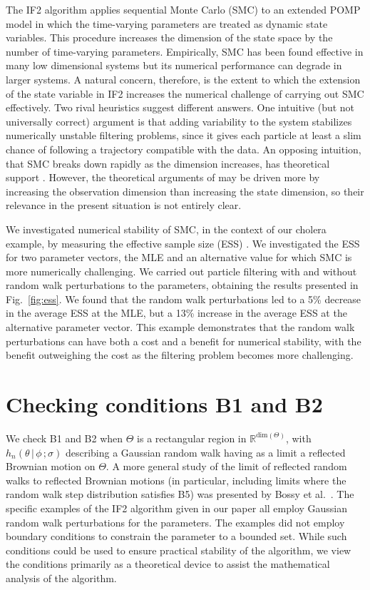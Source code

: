 \documentclass[11pt]{article}
\newcommand{\bbTheta}{\Theta}
\def\R{\mathbb{R}}
\newcommand\Thetaspace{{\bbTheta}}
\newcommand\Thetadim{{\mathrm{dim}}(\Thetaspace)}
\newcommand\given{{\, | \,}}
\newcommand\giventh{\,;}
\begin{document}
The IF2 algorithm applies sequential Monte Carlo (SMC) to an extended POMP model in which the time-varying parameters are treated as dynamic state variables.
This procedure increases the dimension of the state space by the number of time-varying parameters.
Empirically, SMC has been found effective in many low dimensional systems but its numerical performance can degrade in larger systems.
A natural concern, therefore, is the extent to which the extension of the state variable in IF2 increases the numerical challenge of carrying out SMC effectively. 
Two rival heuristics suggest different answers. 
One intuitive (but not universally correct) argument is that adding variability to the system stabilizes numerically unstable filtering problems, since it gives each particle at least a slim chance of following a trajectory compatible with the data.
An opposing intuition, that SMC breaks down rapidly as the dimension increases, has theoretical support \cite{bengtsson08}.
However, the theoretical arguments of \cite{bengtsson08} may be driven more by increasing the observation dimension than increasing the state dimension, so their relevance in the present situation is not entirely clear.

We investigated numerical stability of SMC, in the context of our cholera example, by measuring the effective sample size (ESS) \cite{liu01a}.
We investigated the ESS for two parameter vectors, the MLE and an alternative value for which SMC is more numerically challenging.
We carried out particle filtering with and without random walk perturbations to the parameters, obtaining the results presented in Fig.~\ref{fig:ess}.
We found that the random walk perturbations led to a 5\% decrease in the average ESS at the MLE, but a 13\% increase in the average ESS at the alternative parameter vector.
This example demonstrates that the random walk perturbations can have both a cost and a benefit for numerical stability, with the benefit outweighing the cost as the filtering problem becomes more challenging.



\section{Checking conditions B1 and B2}\label{sec:b1b2}

We check B1 and B2 when $\Theta$ is a rectangular region in $\R^{\Thetadim}$, with $h_n(\theta\given \phi\giventh\sigma)$ describing a Gaussian random walk having as a limit a reflected Brownian motion on $\Theta$. 
A more general study of the limit of reflected random walks to reflected Brownian motions (in particular, including limits where the random walk step distribution satisfies B5) was presented by Bossy et al.~\cite{bossy04}.
The specific examples of the IF2 algorithm given in our paper all employ Gaussian random walk perturbations for the parameters.
The examples did not employ boundary conditions to constrain the parameter to a bounded set. 
While such conditions could be used to ensure practical stability of the algorithm, we view the conditions primarily as a theoretical device to assist the mathematical analysis of the algorithm.
\end{document}
